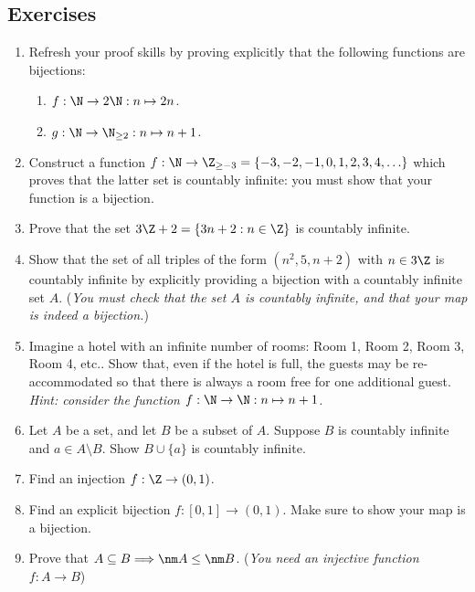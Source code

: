 \subsection*{Exercises}

\begin{enumerate}\renewcommand{\labelenumi}{\thesubsection.\theenumi}
  \item Refresh your proof skills by proving explicitly that the following functions are bijections:
  \begin{enumerate}
    \item $f:\N\to 2\N:n\mapsto 2n$.
    \item $g:\N\to\N_{\ge 2}:n\mapsto n+1$.
  \end{enumerate}
  
	\item Construct a function $f:\N\to\Z_{\ge -3}=\{-3,-2,-1,0,1,2,3,4,\ldots\}$ which proves that the latter set is countably infinite: you must show that your function is a bijection.
	
  \item Prove that the set $3\Z+2=\{3n+2:n\in\Z\}$ is countably infinite.
	
	\item Show that the set of all triples of the form $(n^2,5,n+2)$ with $n\in 3\Z$ is countably infinite by explicitly providing a bijection with a countably infinite set $A$. (\emph{You must check that the set $A$ is countably infinite, and that your map is indeed a bijection.})

	\item Imagine a hotel with an infinite number of rooms: Room 1, Room 2, Room 3, Room 4, etc.. Show that, even if the hotel is full, the guests may be re-accommodated so that there is always a room free for one additional guest.\\
\emph{Hint: consider the function $f:\N\to\N:n\mapsto n+1$.}

\item Let $A$ be a set, and let $B$ be a subset of $A$. Suppose $B$ is countably infinite and $a \in A \setminus B$. Show $B \cup \{a\}$ is countably infinite. 

\item Find an injection $f : \Z \to (0,1)$. 

\item Find an explicit bijection $f : [0,1] \to (0,1)$. Make sure to show your map is a bijection.
	
	\item Prove that $A\subseteq B\Longrightarrow \nm A\le\nm B$. (\emph{You need an injective function $f:A\to B$})
		

\end{enumerate}
